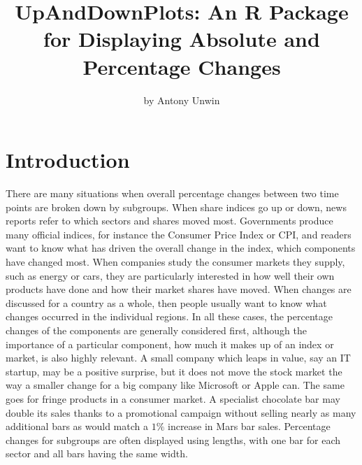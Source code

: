 \title{UpAndDownPlots: An R Package for Displaying Absolute and Percentage Changes}


\author{by Antony Unwin}

\maketitle


\hypertarget{introduction}{%
\section{Introduction}\label{introduction}}

There are many situations when overall percentage changes between two time points are broken down by subgroups. When share indices go up or down, news reports refer to which sectors and shares moved most. Governments produce many official indices, for instance the Consumer Price Index or CPI, and readers want to know what has driven the overall change in the index, which components have changed most. When companies study the consumer markets they supply, such as energy or cars, they are particularly interested in how well their own products have done and how their market shares have moved. When changes are discussed for a country as a whole, then people usually want to know what changes occurred in the individual regions. In all these cases, the percentage changes of the components are generally considered first, although the importance of a particular component, how much it makes up of an index or market, is also highly relevant. A small company which leaps in value, say an IT startup, may be a positive surprise, but it does not move the stock market the way a smaller change for a big company like Microsoft or Apple can. The same goes for fringe products in a consumer market. A specialist chocolate bar may double its sales thanks to a promotional campaign without selling nearly as many additional bars as would match a \(1\%\) increase in Mars bar sales. Percentage changes for subgroups are often displayed using lengths, with one bar for each sector and all bars having the same width.

